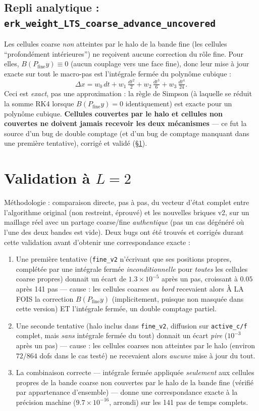 \documentclass[11pt]{article}
\newcommand{\code}[1]{\texttt{#1}}
\begin{document}
\subsection{Repli analytique : \code{erk\_weight\_LTS\_coarse\_advance\_uncovered}}

Les cellules coarse \emph{non} atteintes par le halo de la bande fine (les
cellules ``profondément intérieures'') ne reçoivent aucune correction du
rôle fine. Pour elles, $B(P_{\text{fine}} y) \equiv 0$ (aucun couplage vers
une face fine), donc leur mise à jour exacte sur tout le macro-pas est
l'intégrale fermée du polynôme cubique :
\[
  \Delta x = w_0\, dt + w_1\, \tfrac{dt^2}{2} + w_2\, \tfrac{dt^3}{6}
  + w_3\, \tfrac{dt^4}{24}.
\]
Ceci est \emph{exact}, pas une approximation : la règle de Simpson (à
laquelle se réduit la somme RK4 lorsque $B(P_{\text{fine}} y)=0$
identiquement) est exacte pour un polynôme cubique.
\textbf{Cellules couvertes par le halo et cellules non couvertes ne
doivent jamais recevoir les deux mécanismes} --- ce fut la source d'un bug
de double comptage (et d'un bug de comptage manquant dans une première
tentative), corrigé et validé (\S\ref{sec:validation}).

\section{Validation à $L=2$}
\label{sec:validation}

Méthodologie : comparaison directe, pas à pas, du vecteur d'état complet
entre l'algorithme original (non restreint, éprouvé) et les nouvelles
briques v2, sur un maillage réel avec un partage coarse/fine
\emph{authentique} (pas un cas dégénéré où l'une des deux bandes est
vide). Deux bugs ont été trouvés et corrigés durant cette validation
avant d'obtenir une correspondance exacte :

\begin{enumerate}
  \item Une première tentative (\code{fine\_v2} n'écrivant que ses
  positions propres, complétée par une intégrale fermée
  \emph{inconditionnelle} pour \emph{toutes} les cellules coarse propres)
  donnait un écart de $1.3\times 10^{-5}$ après un pas, croissant à $0.05$
  après 141 pas --- cause : les cellules coarses \emph{au bord} recevaient
  alors À LA FOIS la correction $B(P_{\text{fine}} y)$ (implicitement,
  puisque non masquée dans cette version) ET l'intégrale fermée, un double
  comptage partiel.
  \item Une seconde tentative (halo inclus dans \code{fine\_v2}, diffusion
  sur \code{active\_c/f} complet, mais \emph{sans} intégrale fermée du
  tout) donnait un écart \emph{pire} ($10^{-3}$ après un pas) --- cause :
  les cellules coarses non atteintes par le halo (environ $72/864$ dofs
  dans le cas testé) ne recevaient alors \emph{aucune} mise à jour du
  tout.
  \item La combinaison correcte --- intégrale fermée appliquée
  \emph{seulement} aux cellules propres de la bande coarse non couvertes
  par le halo de la bande fine (vérifié par appartenance d'ensemble) ---
  donne une correspondance exacte à la précision machine
  ($9.7\times 10^{-16}$, arrondi) sur les 141 pas de temps complets.
\end{enumerate}
\end{document}
